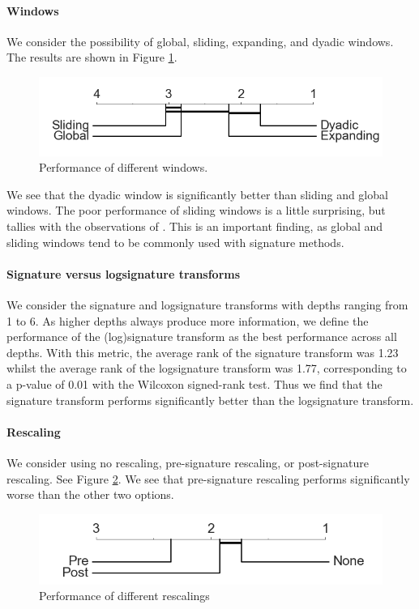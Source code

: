 \documentclass{article}
\theoremstyle{definition}
\theoremstyle{remark}
\begin{document}
	\paragraph{Windows} We consider the possibility of global, sliding, expanding, and dyadic windows. The results are shown in Figure \ref{fig:window}.
	
	\begin{figure}[h]
  		\centering
	  	\vspace{-1em}
  		\includegraphics[width=0.45\linewidth]{images/window.png}
  		\caption{Performance of different windows.}
  		\label{fig:window}
	\end{figure}
	
	We see that the dyadic window is significantly better than sliding and global windows. The poor performance of sliding windows is a little surprising, but tallies with the observations of \citet{fermanian2019embedding}. This is an important finding, as global and sliding windows tend to be commonly used with signature methods.

	\paragraph{Signature versus logsignature transforms} We consider the signature and logsignature transforms with depths ranging from 1 to 6. As higher depths always produce more information, we define the performance of the (log)signature transform as the best performance across all depths. With this metric, the average rank of the signature transform was 1.23 whilst the average rank of the logsignature transform was 1.77, corresponding to a p-value of 0.01 with the Wilcoxon signed-rank test. Thus we find that the signature transform performs significantly better than the logsignature transform.

	\paragraph{Rescaling} We consider using no rescaling, pre-signature rescaling, or post-signature rescaling. See Figure \ref{fig:rescaling}. We see that pre-signature rescaling performs significantly worse than the other two options.
	
	\begin{figure}[h]
  		\centering
	  	\vspace{-1em}
  		\includegraphics[width=.45\linewidth]{images/rescaling.png}
  		\caption{Performance of different rescalings}
  		\label{fig:rescaling}
	\end{figure}
\end{document}

